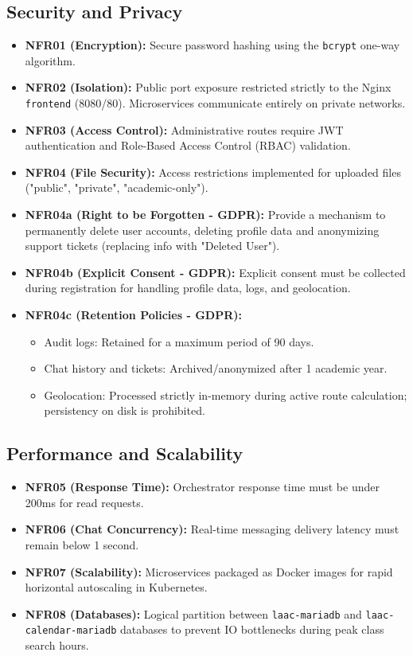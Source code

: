 \subsection{Security and Privacy}
\begin{itemize}
    \item \textbf{NFR01 (Encryption):} Secure password hashing using the \texttt{bcrypt} one-way algorithm.
    \item \textbf{NFR02 (Isolation):} Public port exposure restricted strictly to the Nginx \texttt{frontend} (8080/80). Microservices communicate entirely on private networks.
    \item \textbf{NFR03 (Access Control):} Administrative routes require \ac{JWT} authentication and Role-Based Access Control (\ac{RBAC}) validation.
    \item \textbf{NFR04 (File Security):} Access restrictions implemented for uploaded files ("public", "private", "academic-only").
    \item \textbf{NFR04a (Right to be Forgotten - \ac{GDPR}):} Provide a mechanism to permanently delete user accounts, deleting profile data and anonymizing support tickets (replacing info with "Deleted User").
    \item \textbf{NFR04b (Explicit Consent - \ac{GDPR}):} Explicit consent must be collected during registration for handling profile data, logs, and geolocation.
    \item \textbf{NFR04c (Retention Policies - \ac{GDPR}):}
    \begin{itemize}
        \item Audit logs: Retained for a maximum period of 90 days.
        \item Chat history and tickets: Archived/anonymized after 1 academic year.
        \item Geolocation: Processed strictly in-memory during active route calculation; persistency on disk is prohibited.
    \end{itemize}
\end{itemize}

\subsection{Performance and Scalability}
\begin{itemize}
    \item \textbf{NFR05 (Response Time):} Orchestrator response time must be under 200ms for read requests.
    \item \textbf{NFR06 (Chat Concurrency):} Real-time messaging delivery latency must remain below 1 second.
    \item \textbf{NFR07 (Scalability):} Microservices packaged as Docker images for rapid horizontal autoscaling in Kubernetes.
    \item \textbf{NFR08 (Databases):} Logical partition between \texttt{laac-mariadb} and \texttt{laac-calendar-mariadb} databases to prevent \ac{IO} bottlenecks during peak class search hours.
\end{itemize}

